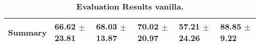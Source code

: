 \begin{table}[htb]
{\begin{tabular}{llllll}
\midrule
\textbf{Summary                                  } &                  \phantom{0}66.62 $\pm$ 23.81 &                      \phantom{0}68.03 $\pm$ 13.87 &                  \phantom{0}70.02 $\pm$ 20.97 &            \phantom{0}57.21 $\pm$ 24.26 &  \phantom{0}88.85 $\pm$ \phantom{0}9.22 \\
\bottomrule
\end{tabular}%
}
\caption{\textbf{Evaluation Results vanilla.}}
\label{tab:eval-results}
\end{table}


